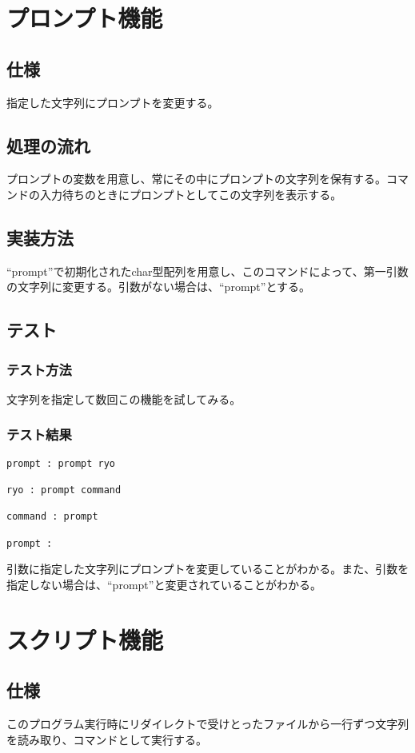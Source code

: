 \documentclass{procreport}
\begin{document}
\section{プロンプト機能}

\subsection{仕様}
指定した文字列にプロンプトを変更する。
\subsection{処理の流れ}
プロンプトの変数を用意し、常にその中にプロンプトの文字列を保有する。コマンドの入力待ちのときにプロンプトとしてこの文字列を表示する。
\subsection{実装方法}
``prompt''で初期化されたchar型配列を用意し、このコマンドによって、第一引数の文字列に変更する。引数がない場合は、``prompt''とする。
\subsection{テスト}
\subsubsection{テスト方法}
文字列を指定して数回この機能を試してみる。
\subsubsection{テスト結果}
\begin{screen}
\begin{verbatim}
prompt : prompt ryo

ryo : prompt command

command : prompt

prompt :
\end{verbatim}
\end{screen}
引数に指定した文字列にプロンプトを変更していることがわかる。また、引数を指定しない場合は、``prompt''と変更されていることがわかる。

\section{スクリプト機能}

\subsection{仕様}
このプログラム実行時にリダイレクトで受けとったファイルから一行ずつ文字列を読み取り、コマンドとして実行する。
\end{document}
